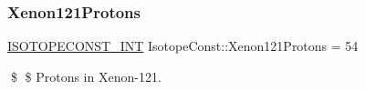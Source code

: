 \subsubsection{\texorpdfstring{Xenon121\+Protons}{Xenon121Protons}}
{\footnotesize\ttfamily \mbox{\hyperlink{group___isotope_const-_macros_ga5f18360b3e99483a35c32d789e62621c}{I\+S\+O\+T\+O\+P\+E\+C\+O\+N\+S\+T\+\_\+\+I\+NT}} Isotope\+Const\+::\+Xenon121\+Protons = 54}

\$ \$ Protons in Xenon-\/121. 
